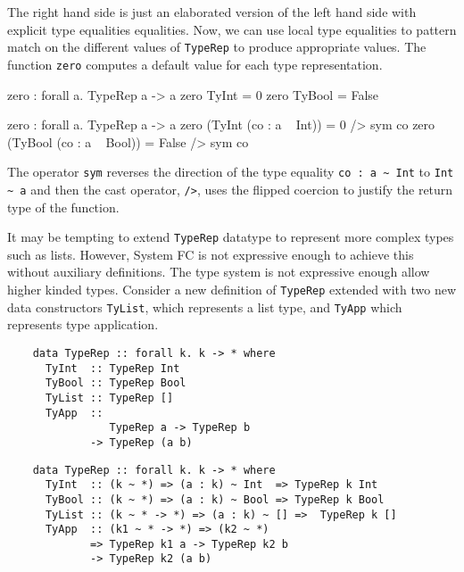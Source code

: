 \documentclass[manuscript,screen,nonacm]{acmart}
\begin{document}
The right hand side is just an elaborated version of the left hand side with explicit type equalities equalities.
Now, we can use local type equalities to pattern match on the different values of \lstinline{TypeRep} to produce appropriate values. The function \lstinline{zero} computes a default value for each type representation.

\begin{minipage}{0.5\linewidth}
  \begin{codef}
    zero : forall a. TypeRep a -> a
    zero TyInt = 0
    zero TyBool = False
  \end{codef}
\end{minipage}%
\begin{minipage}{0.5\linewidth}
  \begin{codef}
    zero : forall a. TypeRep a -> a
    zero (TyInt (co : a ~ Int))   = 0 /> sym co
    zero (TyBool (co : a ~ Bool)) = False /> sym co
  \end{codef}
\end{minipage}

The operator \lstinline|sym| reverses the direction of the type equality \lstinline|co : a ~ Int| to \lstinline|Int ~ a| and then the cast operator, \lstinline{/>}, uses the flipped coercion to justify the return type of the function.

It may be tempting to extend \lstinline{TypeRep} datatype to represent more complex types such as lists. However, System FC is not expressive enough to achieve this without auxiliary definitions. The type system is not expressive enough allow higher kinded types. Consider a new definition of \lstinline{TypeRep} extended with two new data constructors \lstinline{TyList}, which represents a list type, and \lstinline{TyApp} which represents type application.

\begin{minipage}[ht]{0.4\linewidth}
  \begin{lstlisting}
    data TypeRep :: forall k. k -> * where
      TyInt  :: TypeRep Int
      TyBool :: TypeRep Bool
      TyList :: TypeRep []      
      TyApp  ::
                TypeRep a -> TypeRep b
             -> TypeRep (a b)
  \end{lstlisting}
\end{minipage}%
\begin{minipage}[ht]{0.5\linewidth}
  \begin{lstlisting}
    data TypeRep :: forall k. k -> * where
      TyInt  :: (k ~ *) => (a : k) ~ Int  => TypeRep k Int
      TyBool :: (k ~ *) => (a : k) ~ Bool => TypeRep k Bool
      TyList :: (k ~ * -> *) => (a : k) ~ [] =>  TypeRep k []      
      TyApp  :: (k1 ~ * -> *) => (k2 ~ *)
             => TypeRep k1 a -> TypeRep k2 b
             -> TypeRep k2 (a b)
  \end{lstlisting}
\end{minipage}
\end{document}
